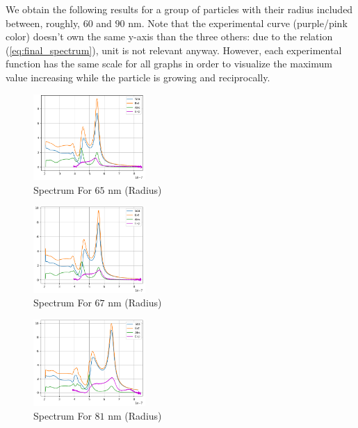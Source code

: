 \documentclass{article}
\numberwithin{equation}{section}
\begin{document}
We obtain the following results for a group of particles with their radius included between, roughly, $60$ and $90$ nm. Note that the experimental curve (purple/pink color) doesn't own the same y-axis than the three others: due to the relation (\ref{eq:final_spectrum}), unit is not relevant anyway. However, each experimental function has the same scale for all graphs in order to visualize the maximum value increasing while the particle is growing and reciprocally.

\begin{figure}[h!]
    \centering
    \includegraphics[width=0.38\textwidth, height=0.28\textwidth]{result_65nm.png}
    \caption{Spectrum For $65$ nm (Radius)}
    \label{fig:result_65nm}
\end{figure}

\begin{figure}[h!]
    \centering
    \includegraphics[width=0.38\textwidth, height=0.28\textwidth]{result_67nm.png}
    \caption{Spectrum For $67$ nm (Radius)}
    \label{fig:result_67nm}
\end{figure}

\begin{figure}[h!]
    \centering
    \includegraphics[width=0.38\textwidth, height=0.28\textwidth]{result_81nm.png}
    \caption{Spectrum For $81$ nm (Radius)}
    \label{fig:result_81nm}
\end{figure}
\end{document}
